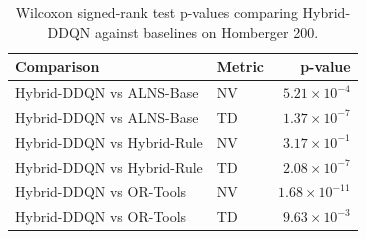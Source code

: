 \begin{table}[htbp]
\centering
\caption{Wilcoxon signed-rank test p-values comparing Hybrid-DDQN against baselines on Homberger 200.}
\label{tab:wilcoxon_homberger_200}
\begin{tabular}{llr}
\hline
\textbf{Comparison} & \textbf{Metric} & \textbf{p-value} \\ \hline
Hybrid-DDQN vs ALNS-Base & NV & $5.21 \times 10^{-4}$ \\
Hybrid-DDQN vs ALNS-Base & TD & $1.37 \times 10^{-7}$ \\
Hybrid-DDQN vs Hybrid-Rule & NV & $3.17 \times 10^{-1}$ \\
Hybrid-DDQN vs Hybrid-Rule & TD & $2.08 \times 10^{-7}$ \\
Hybrid-DDQN vs OR-Tools & NV & $1.68 \times 10^{-11}$ \\
Hybrid-DDQN vs OR-Tools & TD & $9.63 \times 10^{-3}$ \\
\hline
\end{tabular}
\end{table}

